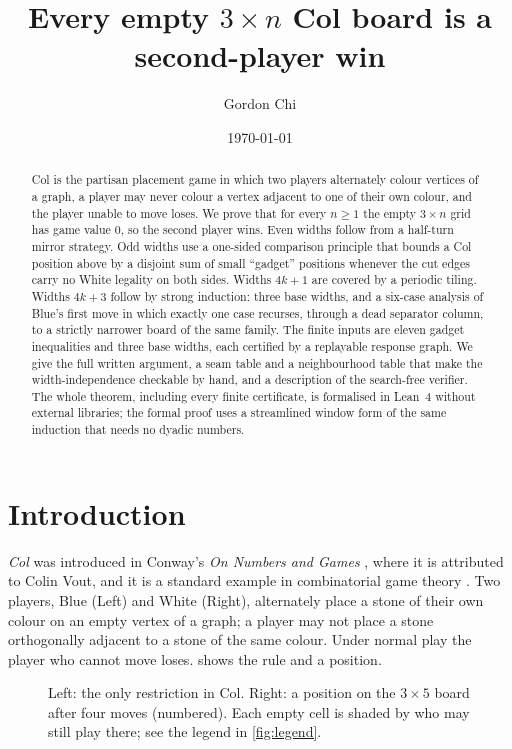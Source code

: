 \documentclass[11pt]{amsart}
\title{Every empty $3\times n$ Col board is a second-player win}
\author{Gordon Chi}
\date{\today}
\theoremstyle{definition}
\begin{document}
\begin{abstract}
Col is the partisan placement game in which two players alternately colour
vertices of a graph, a player may never colour a vertex adjacent to one of
their own colour, and the player unable to move loses. We prove that for every
$n\ge1$ the empty $3\times n$ grid has game value $0$, so the second player
wins. Even widths follow from a half-turn mirror strategy. Odd widths use a
one-sided comparison principle that bounds a Col position above by a disjoint
sum of small ``gadget'' positions whenever the cut edges carry no White
legality on both sides. Widths $4k+1$ are covered by a periodic tiling.
Widths $4k+3$ follow by strong induction: three base widths, and a six-case
analysis of Blue's first move in which exactly one case recurses, through a
dead separator column, to a strictly narrower board of the same family. The
finite inputs are eleven gadget inequalities and three base widths, each
certified by a replayable response graph. We give the full written argument, a
seam table and a neighbourhood table that make the width-independence
checkable by hand, and a description of the search-free verifier. The whole
theorem, including every finite certificate, is formalised in Lean~4 without
external libraries; the formal proof uses a streamlined window form of the
same induction that needs no dyadic numbers.
\end{abstract}
\maketitle

\section{Introduction}

\emph{Col} was introduced in Conway's \emph{On Numbers and Games}
\cite{ONAG}, where it is attributed to Colin Vout, and it is a standard
example in combinatorial game theory \cite{WW,Siegel,LIP}. Two players, Blue
(Left) and White (Right), alternately place a stone of their own colour on an
empty vertex of a graph; a player may not place a stone orthogonally adjacent
to a stone of the same colour. Under normal play the player who cannot move
loses.  shows the rule and a position.

\begin{figure}[ht]
\centering
{}\hspace{1.5cm}
\caption{Left: the only restriction in Col. Right: a position on the
$3\times5$ board after four moves (numbered). Each empty cell is shaded by who
may still play there; see the legend in \cref{fig:legend}.}
\label{fig:rules}
\end{figure}
\end{document}
